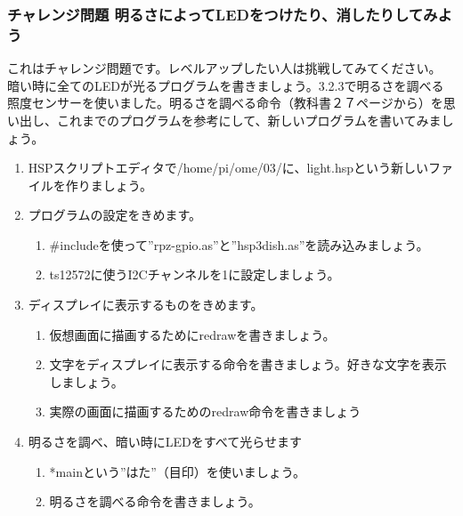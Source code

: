 \documentclass[a4paper,dvipdfmx]{jarticle}
\begin{document}
\subsubsection{}
\clearpage\subsubsection[チャレンジ問題明るさによってLEDをつけたり、消したりしてみよう]{チャレンジ問題\newline
明るさによってLEDをつけたり、消したりしてみよう}
これはチャレンジ問題です。レベルアップしたい人は挑戦してみてください。\newline
暗い時に全てのLEDが光るプログラムを書きましょう。3.2.3で明るさを調べる照度センサーを使いました。明るさを調べる命令（教科書２７ページから）を思い出し、これまでのプログラムを参考にして、新しいプログラムを書いてみましょう。

\begin{enumerate}
\item
HSPスクリプトエディタで/home/pi/ome/03/に、light.hspという新しいファイルを作りましょう。
\item {\color{blue}
プログラムの設定をきめます。}

\begin{enumerate}
\item
\#includeを使って''rpz-gpio.as''と{}''hsp3dish.as''を読み込みましょう。
\item
ts12572に使うI2Cチャンネルを1に設定しましょう。
\end{enumerate}
\item {\color{blue}
ディスプレイに表示するものをきめます。}

\begin{enumerate}
\item
仮想画面に描画するためにredrawを書きましょう。
\item
文字をディスプレイに表示する命令を書きましょう。好きな文字を表示しましょう。
\item
実際の画面に描画するためのredraw命令を書きましょう
\end{enumerate}
\item {\color[rgb]{0.2,0.2,1.0}
明るさを調べ、暗い時にLEDをすべて光らせます}

\begin{enumerate}
\item
*mainという''はた{}''（目印）を使いましょう。
\item
明るさを調べる命令を書きましょう。
\end{enumerate}
\end{enumerate}
\end{document}
